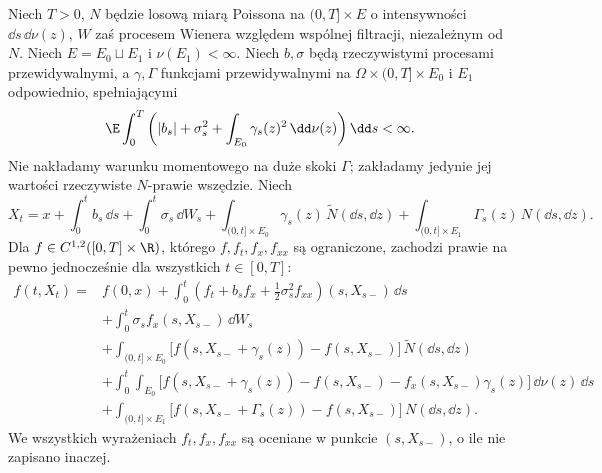\begin{twierdzenie}
\label{th:ito-jump-diffusion}
Niech $T>0$, $N$ będzie losową miarą Poissona na
$(0,T]\times E$ o intensywności $\dd s\,\dd\nu(z)$,
$W$ zaś procesem Wienera względem wspólnej filtracji,
niezależnym od $N$. Niech $E=E_0\sqcup E_1$ i
$\nu(E_1)<\infty$. Niech $b,\sigma$ będą rzeczywistymi
procesami przewidywalnymi, a $\gamma,\Gamma$ funkcjami
przewidywalnymi na $\Omega\times(0,T]\times E_0$ i $E_1$
odpowiednio, spełniającymi
\[
\E\int_0^T\left(|b_s|+\sigma_s^2+
\int_{E_0}\gamma_s(z)^2\,\dd\nu(z)\right)\dd s<\infty.
\]
Nie nakładamy warunku momentowego na duże skoki $\Gamma$;
zakładamy jedynie jej wartości rzeczywiste $N$-prawie wszędzie.
Niech
\[
X_t=x+\int_0^tb_s\,\dd s+\int_0^t\sigma_s\,\dd W_s
+\int_{(0,t]\times E_0}\gamma_s(z)\,\widetilde N(\dd s,\dd z)
+\int_{(0,t]\times E_1}\Gamma_s(z)\,N(\dd s,\dd z).
\]
Dla $f\in C^{1,2}([0,T]\times\R)$, którego
$f,f_t,f_x,f_{xx}$ są ograniczone, zachodzi prawie na pewno
jednocześnie dla wszystkich $t\in[0,T]$:
\[
\begin{split}
f(t,X_t)={}&f(0,x)
+\int_0^t\left(f_t+b_sf_x+\tfrac12\sigma_s^2f_{xx}\right)(s,X_{s-})\,\dd s\\
&+\int_0^t\sigma_s f_x(s,X_{s-})\,\dd W_s\\
&+\int_{(0,t]\times E_0}
\bigl[f(s,X_{s-}+\gamma_s(z))-f(s,X_{s-})\bigr]
\,\widetilde N(\dd s,\dd z)\\
&+\int_0^t\int_{E_0}
\bigl[f(s,X_{s-}+\gamma_s(z))-f(s,X_{s-})
-f_x(s,X_{s-})\gamma_s(z)\bigr] \,\dd\nu(z)\,\dd s\\
&+\int_{(0,t]\times E_1}
\bigl[f(s,X_{s-}+\Gamma_s(z))-f(s,X_{s-})\bigr]
\,N(\dd s,\dd z).
\end{split}
\tag{12.4}\label{eq:ito-jump-general}
\]
We wszystkich wyrażeniach $f_t,f_x,f_{xx}$ są oceniane
w punkcie $(s,X_{s-})$, o ile nie zapisano inaczej.
\end{twierdzenie}

